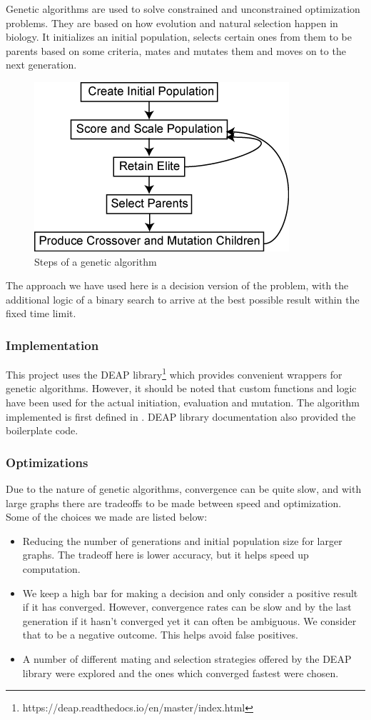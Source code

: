 \documentclass[acmlarge]{acmart}
\begin{document}
Genetic algorithms are used to solve constrained and unconstrained optimization problems. They are based on how evolution and natural selection happen in biology. It initializes an initial population, selects certain ones from them to be parents based on some criteria, mates and mutates them and moves on to the next generation. 

\begin{figure}[h]
	\includegraphics[width=0.4\linewidth]{genetic_diagram.png}
	\caption{Steps of a genetic algorithm \cite{mathworks_2012}}
\end{figure}

The approach we have used here is a decision version of the problem, with the additional logic of a binary search to arrive at the best possible result within the fixed time limit.

\subsubsection{Implementation}
This project uses the DEAP library\footnote{https://deap.readthedocs.io/en/master/index.html} which provides convenient wrappers for genetic algorithms. However, it should be noted that custom functions and logic have been used for the actual initiation, evaluation and mutation. The algorithm implemented is first defined in \cite{back2018evolutionary}. DEAP library documentation also provided the boilerplate code.

\subsubsection{Optimizations}
Due to the nature of genetic algorithms, convergence can be quite slow, and with large graphs there are tradeoffs to be made between speed and optimization. Some of the choices we made are listed below:

\begin{itemize}[topsep=\parskip]
  \item Reducing the number of generations and initial population size for larger graphs. The tradeoff here is lower accuracy, but it helps speed up computation.
  \item We keep a high bar for making a decision and only consider a positive result if it has converged. However, convergence rates can be slow and by the last generation if it hasn’t converged yet it can often be ambiguous. We consider that to be a negative outcome. This helps avoid false positives.
  \item A number of different mating and selection strategies offered by the DEAP library were explored and the ones which converged fastest were chosen.
\end{itemize}
\end{document}
